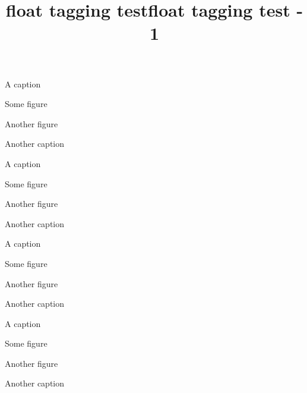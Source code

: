 \documentclass{article}
\title{float tagging test}
\title{float tagging test - 1}
\begin{document}
\begin{plainfloat}
\caption{A caption}
Some figure
\end{plainfloat}

\begin{plainfloat}
Another figure
\caption{Another caption}
\end{plainfloat}

\begin{plaintopfloat}
\caption{A caption}
Some figure
\end{plaintopfloat}

\begin{plaintopfloat}
Another figure
\caption{Another caption}
\end{plaintopfloat}

\begin{boxedfloat}
\caption{A caption}
Some figure
\end{boxedfloat}

\begin{boxedfloat}
Another figure
\caption{Another caption}
\end{boxedfloat}

\begin{ruledfloat}
\caption{A caption}
Some figure
\end{ruledfloat}

\begin{ruledfloat}
Another figure
\caption{Another caption}
\end{ruledfloat}
\end{document}
